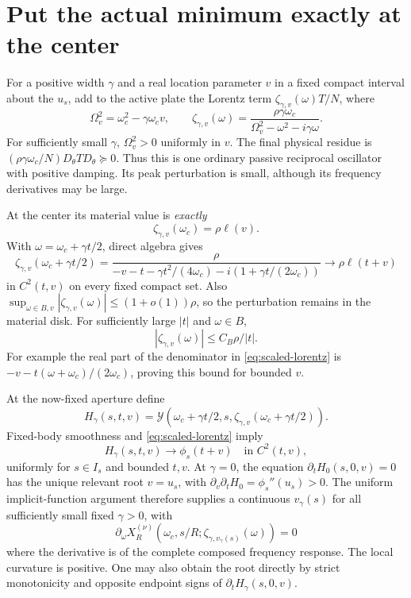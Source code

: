 \documentclass[11pt]{article}
\newcommand{\abs}[1]{\left|#1\right|}
\begin{document}
\section{Put the actual minimum exactly at the center}
For a positive width $\gamma$ and a real location parameter $v$ in a fixed
compact interval about the $u_s$, add to the active plate the Lorentz term
$\zeta_{\gamma,v}(\omega)T/N$, where
\begin{equation}\label{eq:notch}
 \Omega_v^2=\omega_c^2-\gamma\omega_cv,\qquad
 \zeta_{\gamma,v}(\omega)=
 \frac{\rho\gamma\omega_c}
      {\Omega_v^2-\omega^2-i\gamma\omega}.
\end{equation}
For sufficiently small $\gamma$, $\Omega_v^2>0$ uniformly in $v$.
The final physical residue is
$(\rho\gamma\omega_c/N)D_\theta TD_\theta\succeq0$.
Thus this is one ordinary passive reciprocal oscillator with positive damping.
Its peak perturbation is small, although its frequency derivatives may be large.

At the center its material value is \emph{exactly}
\[
 \zeta_{\gamma,v}(\omega_c)=\rho\ell(v).
\]
With $\omega=\omega_c+\gamma t/2$, direct algebra gives
\begin{equation}\label{eq:scaled-lorentz}
 \zeta_{\gamma,v}(\omega_c+\gamma t/2)=
 \frac{\rho}
 {-v-t-\gamma t^2/(4\omega_c)-i(1+\gamma t/(2\omega_c))}
 \longrightarrow \rho\ell(t+v)
\end{equation}
in $C^2(t,v)$ on every fixed compact set. Also
$\sup_{\omega\in B,v}\abs{\zeta_{\gamma,v}(\omega)}
\le(1+o(1))\rho$, so the perturbation remains in the material disk.
For sufficiently large $\abs t$ and $\omega\in B$,
\begin{equation}\label{eq:tail}
 \abs{\zeta_{\gamma,v}(\omega)}\le C_B\rho/\abs t.
\end{equation}
For example the real part of the denominator in \eqref{eq:scaled-lorentz}
is $-v-t(\omega+\omega_c)/(2\omega_c)$, proving this bound for bounded $v$.

At the now-fixed aperture define
\[
 H_\gamma(s,t,v)=
 \mathcal Y(\omega_c+\gamma t/2,s,
               \zeta_{\gamma,v}(\omega_c+\gamma t/2)).
\]
Fixed-body smoothness and \eqref{eq:scaled-lorentz} imply
\begin{equation}\label{eq:inner-limit}
 H_\gamma(s,t,v)\longrightarrow\phi_s(t+v)
 \quad\text{in }C^2(t,v),
\end{equation}
uniformly for $s\in I_s$ and bounded $t,v$.
At $\gamma=0$, the equation $\partial_tH_0(s,0,v)=0$ has the unique relevant
root $v=u_s$, with $\partial_v\partial_tH_0=\phi_s''(u_s)>0$.
The uniform implicit-function argument therefore supplies a continuous
$v_\gamma(s)$ for all sufficiently small fixed $\gamma>0$, with
\begin{equation}\label{eq:stationary}
 \partial_\omega X_R^{(\nu)}(
   \omega_c,s/R;\zeta_{\gamma,v_\gamma(s)}(\omega))=0
\end{equation}
where the derivative is of the complete composed frequency response.
The local curvature is positive. One may also obtain the root directly by
strict monotonicity and opposite endpoint signs of
$\partial_tH_\gamma(s,0,v)$.
\end{document}
